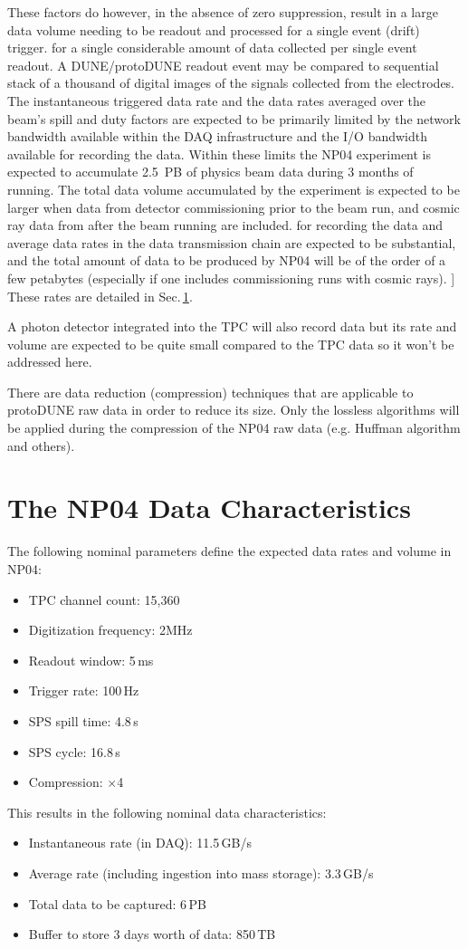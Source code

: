\documentclass[a4paper]{jpconf}
\newcommand{\Omit}[1]{}
\newcommand{\pd}{protoDUNE\xspace}
\begin{document}
\noindent These factors do however, in the absence of zero
suppression, result in a large data volume needing to be readout and
processed for a single event (drift) trigger. for a
single considerable amount of data collected per single event readout.
A DUNE/\pd readout event may be compared to sequential stack of a thousand of digital
images of the signals collected from the electrodes. 
The instantaneous triggered data rate and the data rates averaged over
the beam's spill and duty factors are expected to be primarily limited
by the network bandwidth available within the DAQ infrastructure and
the I/O bandwidth available for recording the data.  Within these
limits the NP04 experiment is expected to accumulate 2.5~PB of physics beam
data during 3 months of running.  The total data volume accumulated by
the experiment is expected to be larger when data from
detector commissioning prior to the beam run, and cosmic ray data from
after the beam running are included. 
\Omit[for recording the data and average data rates in the data transmission chain are expected to be substantial, 
and the total amount of data to be produced by NP04 will be of the order of a few
petabytes (especially if one includes commissioning runs with cosmic
rays). ] These rates are detailed in Sec.\,\ref{sec:np04_data_rate}.

A photon detector integrated into the TPC will also record data but its rate and volume are
expected to be quite small compared to the TPC data so it won't be addressed here.

There are data reduction (compression) techniques that are applicable to \pd raw data in order to reduce its size. 
Only the lossless algorithms will be applied during the compression of the NP04 raw data
(e.g. Huffman algorithm and others).

\section{The NP04 Data Characteristics}
\label{sec:np04_data_rate}
The following nominal parameters define the expected data rates and volume in NP04:
\begin{itemize}
\item TPC channel count: 15,360
\item Digitization frequency: 2MHz
\item Readout window: 5\,ms
\item Trigger rate: 100\,Hz
\item SPS spill time: 4.8\,s
\item SPS cycle: 16.8\,s
\item Compression: $\times$4
\end{itemize}
\noindent This results in the following nominal data characteristics:
\begin{itemize}
\item Instantaneous rate (in DAQ): 11.5\,GB/s
\item Average rate (including ingestion into mass storage): 3.3\,GB/s
\item Total data to be captured: 6\,PB
\item Buffer to store 3 days worth of data: 850\,TB

\end{itemize}
\end{document}
